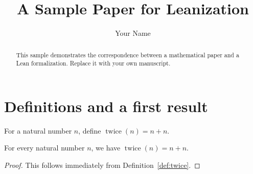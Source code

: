 \documentclass{article}
\title{A Sample Paper for Leanization}
\author{Your Name}
\date{}
\begin{document}
\maketitle
\begin{abstract}
This sample demonstrates the correspondence between a mathematical paper
and a Lean formalization. Replace it with your own manuscript.
\end{abstract}
\section{Definitions and a first result}
\begin{definition}\label{def:twice}
For a natural number $n$, define $\operatorname{twice}(n)=n+n$.
\end{definition}
\begin{theorem}\label{thm:expansion}
For every natural number $n$, we have $\operatorname{twice}(n)=n+n$.
\end{theorem}
\begin{proof}
This follows immediately from Definition~\ref{def:twice}.
\end{proof}
\end{document}

